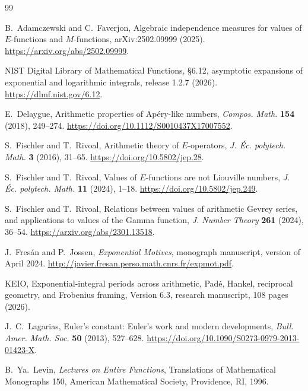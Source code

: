 \documentclass[11pt]{article}
\theoremstyle{definition}
\theoremstyle{remark}
\begin{document}
\begin{thebibliography}{99}
\small
\raggedright

B.~Adamczewski and C.~Faverjon,
\newblock Algebraic independence measures for values of \(E\)-functions and
\(M\)-functions,
\newblock arXiv:2502.09999 (2025).
\newblock \url{https://arxiv.org/abs/2502.09999}.

NIST Digital Library of Mathematical Functions,
\newblock \S6.12, asymptotic expansions of exponential and logarithmic
integrals,
\newblock release 1.2.7 (2026).
\newblock \url{https://dlmf.nist.gov/6.12}.

E.~Delaygue,
\newblock Arithmetic properties of Ap\'ery-like numbers,
\newblock \emph{Compos. Math.} \textbf{154} (2018), 249--274.
\newblock \url{https://doi.org/10.1112/S0010437X17007552}.

S.~Fischler and T.~Rivoal,
\newblock Arithmetic theory of \(E\)-operators,
\newblock \emph{J. \'Ec. polytech. Math.} \textbf{3} (2016), 31--65.
\newblock \url{https://doi.org/10.5802/jep.28}.

S.~Fischler and T.~Rivoal,
\newblock Values of \(E\)-functions are not Liouville numbers,
\newblock \emph{J. \'Ec. polytech. Math.} \textbf{11} (2024), 1--18.
\newblock \url{https://doi.org/10.5802/jep.249}.

S.~Fischler and T.~Rivoal,
\newblock Relations between values of arithmetic Gevrey series, and
applications to values of the Gamma function,
\newblock \emph{J. Number Theory} \textbf{261} (2024), 36--54.
\newblock \url{https://arxiv.org/abs/2301.13518}.

J.~Fres\'an and P.~Jossen,
\newblock \emph{Exponential Motives},
\newblock monograph manuscript, version of April 2024.
\newblock \url{http://javier.fresan.perso.math.cnrs.fr/expmot.pdf}.

KEIO,
\newblock Exponential-integral periods across arithmetic, Pad\'e, Hankel,
reciprocal geometry, and Frobenius framing,
\newblock Version 6.3, research manuscript, 108 pages (2026).

J.~C.~Lagarias,
\newblock Euler's constant: Euler's work and modern developments,
\newblock \emph{Bull. Amer. Math. Soc.} \textbf{50} (2013), 527--628.
\newblock \url{https://doi.org/10.1090/S0273-0979-2013-01423-X}.

B.~Ya.~Levin,
\newblock \emph{Lectures on Entire Functions},
\newblock Translations of Mathematical Monographs 150,
American Mathematical Society, Providence, RI, 1996.


\end{thebibliography}
\end{document}
